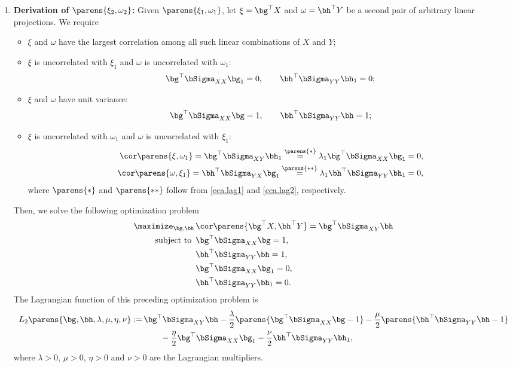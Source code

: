 \documentclass[12pt]{article}
\begin{document}
\begin{enumerate}[label=\textbf{\arabic*.}]
	\item \textbf{Derivation of $\parens{\xi_2, \omega_2}$:} Given $\parens{\xi_1, \omega_1}$, let $\xi = \bg^\top X$ and $\omega = \bh^\top Y$ be a second pair of arbitrary linear projections. We require 
	\begin{itemize}
		\item $\xi$ and $\omega$ have the largest correlation among all such linear combinations of $X$ and $Y$; 
		\item $\xi$ is uncorrelated with $\xi_1$ and $\omega$ is uncorrelated with $\omega_1$: 
		\begin{align}
			\bg^\top \bSigma_{XX} \bg_1 = 0, \qquad \bh^\top \bSigma_{YY} \bh_1 = 0; 
		\end{align}
		\item $\xi$ and $\omega$ have unit variance: 
		\begin{align}
			\bg^\top \bSigma_{XX} \bg = 1, \qquad \bh^\top \bSigma_{YY} \bh = 1;   
		\end{align}
		\item $\xi$ is uncorrelated with $\omega_1$ and $\omega$ is uncorrelated with $\xi_1$: 
		\begin{align}
			\cor \parens{\xi, \omega_1} = \bg^\top \bSigma_{XY} \bh_1 \stackrel{\parens{*}}{=} \lambda_1 \bg^\top \bSigma_{XX} \bg_1 = 0, \\ 
			\cor \parens{\omega, \xi_1} = \bh^\top \bSigma_{YX} \bg_1 \stackrel{\parens{**}}{=} \lambda_1 \bh^\top \bSigma_{YY} \bh_1 = 0, 
		\end{align}
		where $\parens{*}$ and $\parens{**}$ follow from \eqref{cca.lag1} and \eqref{cca.lag2}, respectively. 
	\end{itemize}
	Then, we solve the following optimization problem 
	\begin{equation}
		\begin{aligned}
		\maximize_{\bg, \bh} & \, \cor \parens{\bg^\top X, \bh^\top Y} = \bg^\top \bSigma_{XY} \bh \\ 
		\text{ subject to } & \, \bg^\top \bSigma_{XX} \bg = 1, \\
		& \, \bh^\top \bSigma_{YY} \bh = 1, \\
		& \, \bg^\top \bSigma_{XX} \bg_1 = 0, \\
		& \, \bh^\top \bSigma_{YY} \bh_1 = 0. 
	\end{aligned} 
	\end{equation}
	The Lagrangian function of this preceding optimization problem is 
	\begin{align}
		L_2 \parens{\bg, \bh, \lambda, \mu, \eta, \nu} := & \, \bg^\top \bSigma_{XY} \bh - \frac{\lambda}{2} \parens{\bg^\top \bSigma_{XX} \bg - 1} - \frac{\mu}{2} \parens{\bh^\top \bSigma_{YY} \bh - 1} \nonumber \\ & \, \qquad - \frac{\eta}{2} \bg^\top \bSigma_{XX} \bg_1 - \frac{\nu}{2} \bh^\top \bSigma_{YY} \bh_1, 
	\end{align}
	where $\lambda > 0$, $\mu > 0$, $\eta > 0$ and $\nu > 0$ are the Lagrangian multipliers. 
	

\end{enumerate}
\end{document}
